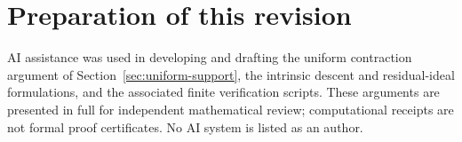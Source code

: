 \section*{Preparation of this revision}
AI assistance was used in developing and drafting the uniform
contraction argument of Section~\ref{sec:uniform-support}, the
intrinsic descent and residual-ideal formulations, and the associated
finite verification scripts.  These arguments are presented in full
for independent mathematical review; computational receipts are not
formal proof certificates.  No AI system is listed as an author.
